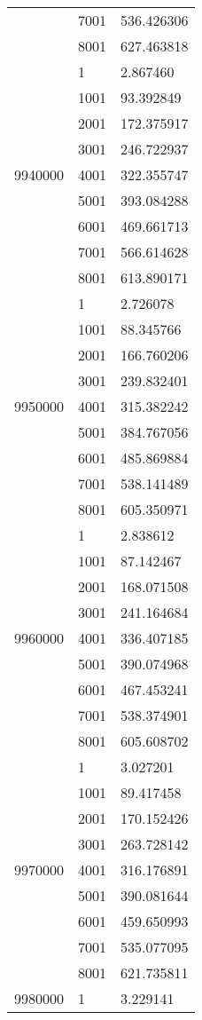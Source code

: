 \begin{table}[htb!]
\begin{tabular}{lll}
 & 7001 & 536.426306 \\
 & 8001 & 627.463818 \\
\multirow[c]{9}{*}{9940000} & 1 & 2.867460 \\
 & 1001 & 93.392849 \\
 & 2001 & 172.375917 \\
 & 3001 & 246.722937 \\
 & 4001 & 322.355747 \\
 & 5001 & 393.084288 \\
 & 6001 & 469.661713 \\
 & 7001 & 566.614628 \\
 & 8001 & 613.890171 \\
\multirow[c]{9}{*}{9950000} & 1 & 2.726078 \\
 & 1001 & 88.345766 \\
 & 2001 & 166.760206 \\
 & 3001 & 239.832401 \\
 & 4001 & 315.382242 \\
 & 5001 & 384.767056 \\
 & 6001 & 485.869884 \\
 & 7001 & 538.141489 \\
 & 8001 & 605.350971 \\
\multirow[c]{9}{*}{9960000} & 1 & 2.838612 \\
 & 1001 & 87.142467 \\
 & 2001 & 168.071508 \\
 & 3001 & 241.164684 \\
 & 4001 & 336.407185 \\
 & 5001 & 390.074968 \\
 & 6001 & 467.453241 \\
 & 7001 & 538.374901 \\
 & 8001 & 605.608702 \\
\multirow[c]{9}{*}{9970000} & 1 & 3.027201 \\
 & 1001 & 89.417458 \\
 & 2001 & 170.152426 \\
 & 3001 & 263.728142 \\
 & 4001 & 316.176891 \\
 & 5001 & 390.081644 \\
 & 6001 & 459.650993 \\
 & 7001 & 535.077095 \\
 & 8001 & 621.735811 \\
\multirow[c]{9}{*}{9980000} & 1 & 3.229141 \\

\end{tabular}
\end{table}
